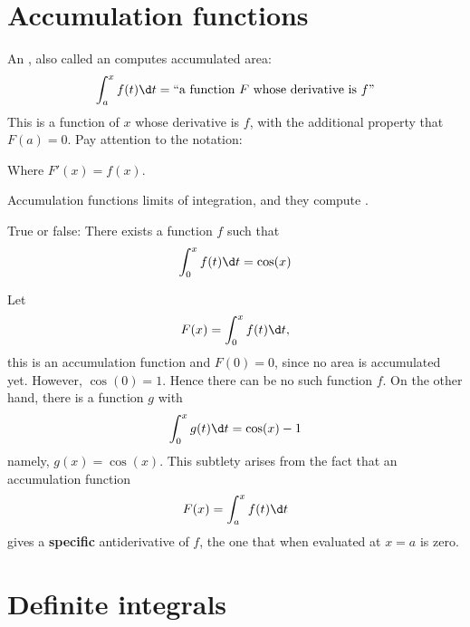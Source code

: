 \documentclass{ximera}
\begin{document}
\section{Accumulation functions}

An , also called an 
computes accumulated area:
\[
\int_a^x f(t) \d t = ``\text{a function $F$ whose derivative is $f$''}
\]
This is a function of $x$ whose derivative is $f$, with the additional
property that $F(a)=0$.  Pay attention to the notation:
\begin{image}
\end{image}
Where $F'(x) = f(x)$.
\begin{explanation}%
  Accumulation functions  limits of integration, and they compute
  .
\end{explanation}
\begin{question}
  True or false: There exists a function $f$ such that 
  \[
  \int_0^x f(t) \d t = \cos(x)
  \]
  \begin{multipleChoice}
  \end{multipleChoice}
  \begin{feedback}
    Let
    \[
    F(x) = \int_0^x f(t) \d t,
    \]
    this is an accumulation function and $F(0) = 0$, since no area is
    accumulated yet. However, $\cos(0) =1$. Hence there can be no such
    function $f$. On the other hand, there is a function $g$ with
     \[
     \int_0^x g(t) \d t = \cos(x)-1
     \]
     namely, $g(x) = \cos(x)$. This subtlety arises from the fact that an
     accumulation function
     \[
     F(x) = \int_a^x f(t) \d t
     \]
     gives a \textbf{specific} antiderivative of $f$, the one that
     when evaluated at $x=a$ is zero.
  \end{feedback}
\end{question}










\section{Definite integrals}
\end{document}
